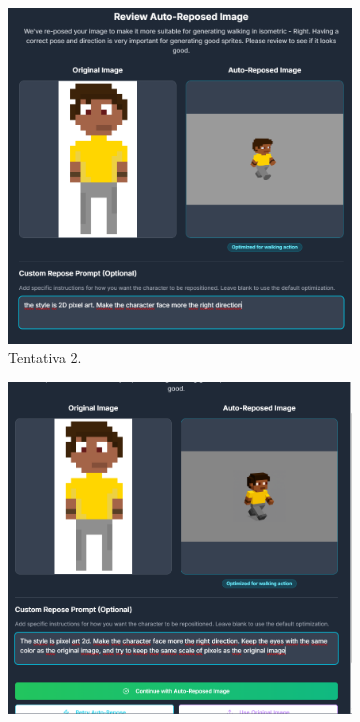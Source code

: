 \begin{figure}[htbp]
\begin{subfigure}{0.35\linewidth}
        \includegraphics[width=1\linewidth]{figs/godmodAI/tela auto repose 2.PNG}
        \caption{\small Tentativa 2.}
        \label{fig:godmodAIrepose2}
    \end{subfigure}
    \begin{subfigure}{0.45\linewidth}
        \includegraphics[width=1\linewidth]{figs/godmodAI/tela auto repose 3.PNG}

\end{subfigure}
\end{figure}
